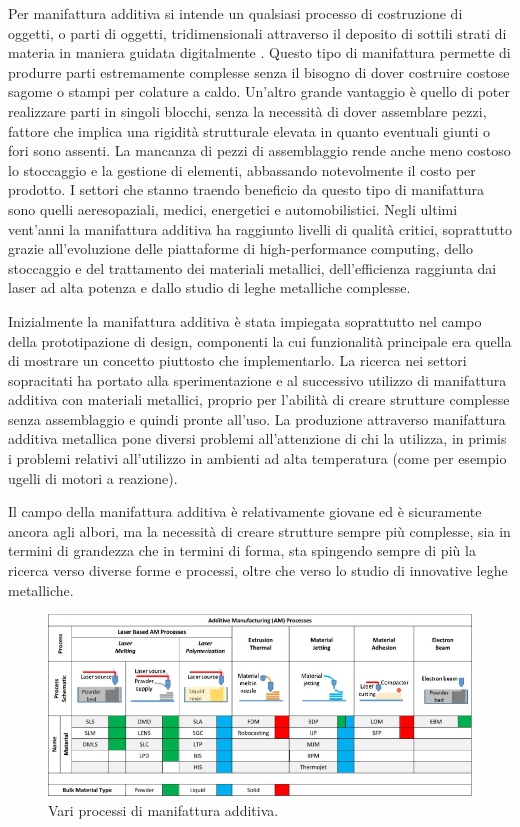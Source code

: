 Per manifattura additiva si intende un qualsiasi processo di costruzione di oggetti, o parti di oggetti, tridimensionali
attraverso il deposito di sottili strati di materia in maniera guidata digitalmente \cite{DebRoyT2018Amom}.
Questo tipo di manifattura permette di produrre parti estremamente complesse senza il bisogno di dover costruire
costose sagome o stampi per colature a caldo. Un'altro grande vantaggio è quello di poter realizzare parti in singoli blocchi,
senza la necessità di dover assemblare pezzi, fattore che implica una rigidità strutturale elevata in quanto eventuali giunti o fori sono assenti.
La mancanza di pezzi di assemblaggio rende anche meno costoso lo stoccaggio e la gestione di elementi, abbassando notevolmente il costo per prodotto.
I settori che stanno traendo beneficio da questo tipo di manifattura sono quelli aeresopaziali, medici, energetici e automobilistici.
Negli ultimi vent'anni la manifattura additiva ha raggiunto livelli di qualità critici, soprattutto grazie all'evoluzione
delle piattaforme di high-performance computing, dello stoccaggio e del trattamento dei materiali metallici, dell'efficienza raggiunta dai laser ad alta potenza
e dallo studio di leghe metalliche complesse.

Inizialmente la manifattura additiva è stata impiegata soprattutto nel campo della prototipazione di design,
componenti la cui funzionalità principale era quella di mostrare un concetto piuttosto che implementarlo.
La ricerca nei settori sopracitati ha portato alla sperimentazione e al successivo utilizzo di manifattura additiva con materiali metallici, 
proprio per l'abilità di creare strutture complesse senza assemblaggio e quindi pronte all'uso.
La produzione attraverso manifattura additiva metallica pone diversi problemi all'attenzione di chi la utilizza, in primis i problemi relativi all'utilizzo in ambienti ad alta temperatura
(come per esempio ugelli di motori a reazione).

Il campo della manifattura additiva è relativamente giovane ed è sicuramente ancora agli albori,
ma la necessità di creare strutture sempre più complesse, sia in termini di grandezza che in termini di forma, sta spingendo 
sempre di più la ricerca verso diverse forme e processi, oltre che verso lo studio di innovative leghe metalliche.
\begin{figure}[H]
    \centering
    \includegraphics[width=\linewidth]{figure/ad.jpg}
    \caption{Vari processi di manifattura additiva.}
\end{figure}

